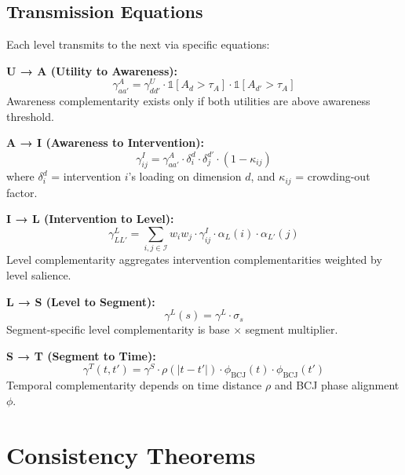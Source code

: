\subsection{Transmission Equations}

Each level transmits to the next via specific equations:

\begin{tcolorbox}[colback=gray!5!white, colframe=gray!75!black,
    title=Theorem GTC-2: Transmission Equations]

\textbf{U → A (Utility to Awareness):}
\begin{equation}
\gamma^A_{aa'} = \gamma^U_{dd'} \cdot \mathbb{1}[A_d > \tau_A] \cdot \mathbb{1}[A_{d'} > \tau_A]
\end{equation}
Awareness complementarity exists only if both utilities are above awareness threshold.

\textbf{A → I (Awareness to Intervention):}
\begin{equation}
\gamma^I_{ij} = \gamma^A_{aa'} \cdot \delta_i^d \cdot \delta_j^{d'} \cdot (1 - \kappa_{ij})
\end{equation}
where $\delta_i^d$ = intervention $i$'s loading on dimension $d$, and
$\kappa_{ij}$ = crowding-out factor.

\textbf{I → L (Intervention to Level):}
\begin{equation}
\gamma^L_{LL'} = \sum_{i,j \in \mathcal{I}} w_i w_j \cdot \gamma^I_{ij} \cdot \alpha_L(i) \cdot \alpha_{L'}(j)
\end{equation}
Level complementarity aggregates intervention complementarities weighted by
level salience.

\textbf{L → S (Level to Segment):}
\begin{equation}
\gamma^L(s) = \gamma^L \cdot \sigma_s
\end{equation}
Segment-specific level complementarity is base $\times$ segment multiplier.

\textbf{S → T (Segment to Time):}
\begin{equation}
\gamma^T(t, t') = \gamma^S \cdot \rho(|t - t'|) \cdot \phi_{\text{BCJ}}(t) \cdot \phi_{\text{BCJ}}(t')
\end{equation}
Temporal complementarity depends on time distance $\rho$ and BCJ phase alignment $\phi$.

\end{tcolorbox}

\section{Consistency Theorems}
\label{sec:gtc-consistency}


